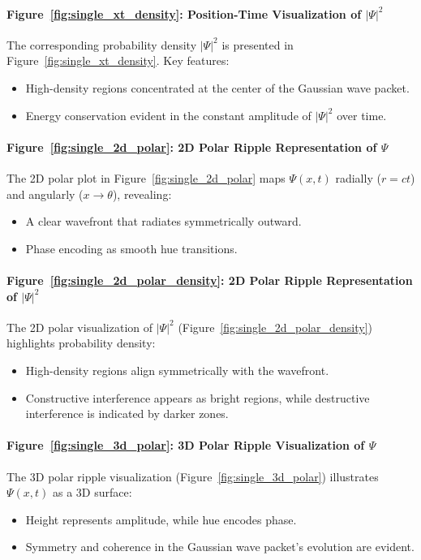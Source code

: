 \documentclass[12pt]{article}
\begin{document}
\paragraph{Figure~\ref{fig:single_xt_density}: Position-Time Visualization of \(|\Psi|^2\)}
The corresponding probability density \(|\Psi|^2\) is presented in Figure~\ref{fig:single_xt_density}. Key features:
\begin{itemize}
    \item High-density regions concentrated at the center of the Gaussian wave packet.
    \item Energy conservation evident in the constant amplitude of \(|\Psi|^2\) over time.
\end{itemize}

\paragraph{Figure~\ref{fig:single_2d_polar}: 2D Polar Ripple Representation of \(\Psi\)}
The 2D polar plot in Figure~\ref{fig:single_2d_polar} maps \(\Psi(x,t)\) radially (\(r = ct\)) and angularly (\(x \to \theta\)), revealing:
\begin{itemize}
    \item A clear wavefront that radiates symmetrically outward.
    \item Phase encoding as smooth hue transitions.
\end{itemize}

\paragraph{Figure~\ref{fig:single_2d_polar_density}: 2D Polar Ripple Representation of \(|\Psi|^2\)}
The 2D polar visualization of \(|\Psi|^2\) (Figure~\ref{fig:single_2d_polar_density}) highlights probability density:
\begin{itemize}
    \item High-density regions align symmetrically with the wavefront.
    \item Constructive interference appears as bright regions, while destructive interference is indicated by darker zones.
\end{itemize}

\paragraph{Figure~\ref{fig:single_3d_polar}: 3D Polar Ripple Visualization of \(\Psi\)}
The 3D polar ripple visualization (Figure~\ref{fig:single_3d_polar}) illustrates \(\Psi(x,t)\) as a 3D surface:
\begin{itemize}
    \item Height represents amplitude, while hue encodes phase.
    \item Symmetry and coherence in the Gaussian wave packet's evolution are evident.
\end{itemize}
\end{document}
